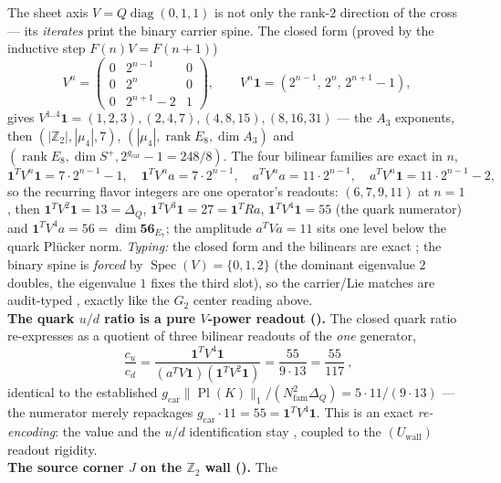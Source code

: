\documentclass[11pt,a4paper]{article}
\newcommand{\gcar}{g_{\mathrm{car}}}
\newcommand{\Nfam}{N_{\mathrm{fam}}}
\newcommand{\Z}{\mathbb{Z}}
\theoremstyle{definition}
\begin{document}
\begin{keybox}
The sheet axis $V=Q\operatorname{diag}(0,1,1)$ is not only the rank-$2$ direction of the cross --- its
\emph{iterates} print the binary carrier spine. The closed form (proved by the inductive step
$F(n)V=F(n{+}1)$)
\[
  V^n=\begin{pmatrix}0&2^{n-1}&0\\0&2^{n}&0\\0&2^{n+1}-2&1\end{pmatrix},\qquad
  V^n\mathbf 1=(2^{n-1},\,2^{n},\,2^{n+1}-1),
\]
gives $V^{1..4}\mathbf 1=(1,2,3),(2,4,7),(4,8,15),(8,16,31)$ --- the $A_3$ exponents, then
$(|\Z_2|,|\mu_4|,7)$, $(|\mu_4|,\operatorname{rank}E_8,\dim A_3)$ and
$(\operatorname{rank}E_8,\dim S^+,2^{\gcar}{-}1{=}248/8)$. The four bilinear families are exact in $n$,
\[
  \mathbf 1^TV^n\mathbf 1=7\cdot2^{n-1}-1,\quad \mathbf 1^TV^na=7\cdot2^{n-1},\quad
  a^TV^na=11\cdot2^{n-1},\quad a^TV^n\mathbf 1=11\cdot2^{n-1}-2,
\]
so the recurring flavor integers are one operator's readouts: $(6,7,9,11)$ at $n{=}1$, then
$\mathbf 1^TV^2\mathbf 1=13=\Delta_Q$, $\mathbf 1^TV^3\mathbf 1=27=\mathbf 1^TRa$,
$\mathbf 1^TV^4\mathbf 1=55$ (the quark numerator) and $\mathbf 1^TV^4a=56=\dim\mathbf{56}_{E_7}$; the
amplitude $a^TVa=11$ sits one level below the quark Pl\"ucker norm. \emph{Typing:} the closed form and
the bilinears are exact \mE; the binary spine is \emph{forced} by $\operatorname{Spec}(V)=\{0,1,2\}$ (the
dominant eigenvalue $2$ doubles, the eigenvalue $1$ fixes the third slot), so the carrier/Lie matches are
audit-typed \mC, exactly like the $G_2$ center reading above.
\smallskip\\
\noindent\textbf{The quark $u/d$ ratio is a pure $V$-power readout ().}
The closed quark ratio re-expresses as a quotient of three bilinear readouts of the \emph{one} generator,
\[
  \boxed{\ \frac{c_u}{c_d}=\frac{\mathbf 1^TV^4\mathbf 1}{(a^TV\mathbf 1)(\mathbf 1^TV^2\mathbf 1)}
  =\frac{55}{9\cdot13}=\frac{55}{117}\ },
\]
identical to the established $\gcar\|\operatorname{Pl}(K)\|_1/(\Nfam^2\Delta_Q)=5\cdot11/(9\cdot13)$ --- the
numerator merely repackages $\gcar\cdot11=55=\mathbf 1^TV^4\mathbf 1$. This is an exact \emph{re-encoding}:
the value and the $u/d$ identification stay \mC, coupled to the $(U_{\mathrm{wall}})$ readout rigidity.
\smallskip\\
\noindent\textbf{The source corner $J$ on the $\Z_2$ wall ().} The

\end{keybox}
\end{document}
